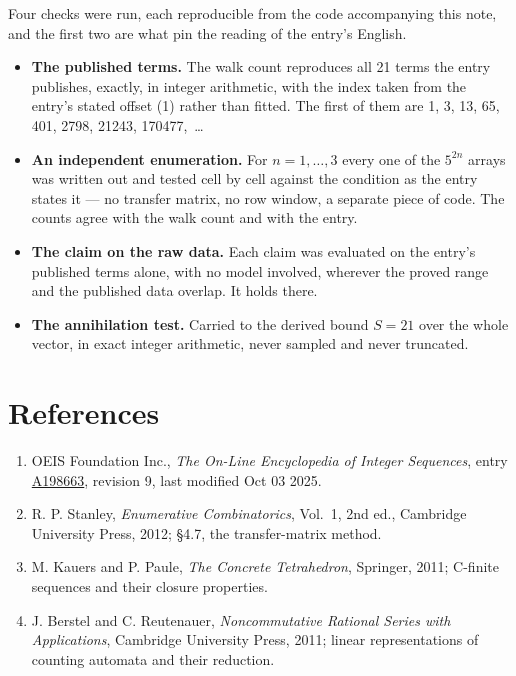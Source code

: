 \documentclass[11pt]{article}
\theoremstyle{definition}
\begin{document}
Four checks were run, each reproducible from the code accompanying this note, and the first two are what pin the reading of the entry's English.

\begin{itemize}

\item {\bfseries The published terms.} The walk count reproduces all 21 terms the entry publishes, exactly, in integer arithmetic, with the index taken from the entry's stated offset (1) rather than fitted. The first of them are 1, 3, 13, 65, 401, 2798, 21243, 170477,~\dots

\item {\bfseries An independent enumeration.} For $n = 1,\dots,3$ every one of the $5^{2n}$ arrays was written out and tested cell by cell against the condition as the entry states it --- no transfer matrix, no row window, a separate piece of code. The counts agree with the walk count and with the entry.

\item {\bfseries The claim on the raw data.} Each claim was evaluated on the entry's published terms alone, with no model involved, wherever the proved range and the published data overlap. It holds there.

\item {\bfseries The annihilation test.} Carried to the derived bound $S = 21$ over the whole vector, in exact integer arithmetic, never sampled and never truncated.

\end{itemize}

\section{References}

\begin{enumerate}

\item OEIS Foundation Inc., \emph{The On-Line Encyclopedia of Integer Sequences}, entry \href{https://oeis.org/A198663}{A198663}, revision 9, last modified Oct 03 2025.

\item R. P. Stanley, \emph{Enumerative Combinatorics}, Vol.~1, 2nd ed., Cambridge University Press, 2012; \S4.7, the transfer-matrix method.

\item M. Kauers and P. Paule, \emph{The Concrete Tetrahedron}, Springer, 2011; C-finite sequences and their closure properties.

\item J. Berstel and C. Reutenauer, \emph{Noncommutative Rational Series with Applications}, Cambridge University Press, 2011; linear representations of counting automata and their reduction.

\end{enumerate}
\end{document}
